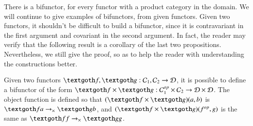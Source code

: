 \documentclass [12pt]{book}
\begin{document}
There is a bifunctor, for every functor with a product category in the domain. We will continue to give examples of bifunctors, from given functors. Given two functors, it shouldn't be difficult to build a bifunctor, since it is contravariant in the first argument and covariant in the second argument. In fact, the reader may verify that the following result is a corollary of the last two propositions. Nevertheless, we still give the proof, so as to help the reader with understanding the constructions better.

\begin{proposition}Given two functors $\textgoth f,\textgoth g:\mathcal C_1, \mathcal C_2\rightarrow\mathcal D$, it is possible to define a bifunctor of the form $\textgoth f\times\textgoth g:\mathcal C_1^{op}\times\mathcal C_2\rightarrow\mathcal D\times\mathcal D$. The object function is defined so that $(\textgoth f\times\textgoth g)(a,b)$ is $\textgoth fa\rightarrow_\times\textgoth gb$, and $(\textgoth f\times\textgoth g)(f^{op},g)$ is the same as $\textgoth ff\rightarrow_\times\textgoth gg$.\label{bif prop3}\end{proposition}
\end{document}
